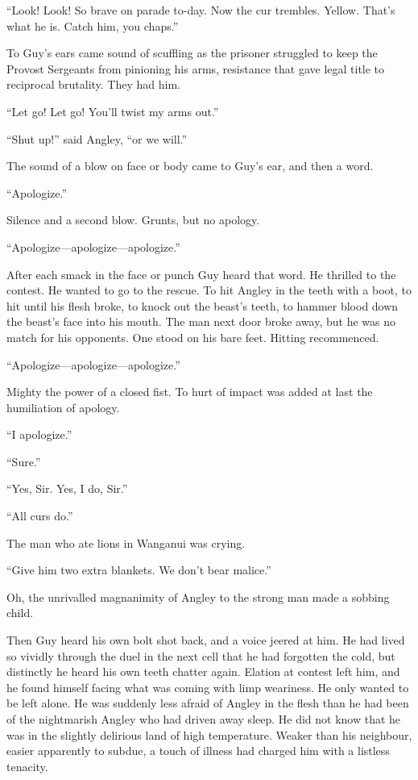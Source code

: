 ``Look! Look! So brave on parade to-day. Now the cur trembles. Yellow. 
That's what he is. Catch him, you chaps.''

To Guy's ears came sound of scuffling as the prisoner struggled to 
keep the Provost Sergeants from pinioning his arms, resistance that 
gave legal title to reciprocal brutality. They had him.

``Let go! Let go! You'll twist my arms out.''

``Shut up!'' said Angley, ``or we will.''

The sound of a blow on face or body came to Guy's ear, and then a 
word.

``Apologize.''

Silence and a second blow. Grunts, but no apology.

``Apologize---apologize---apologize.''

After each smack in the face or punch Guy heard that word. He 
thrilled to the contest. He wanted to go to the rescue. To hit 
Angley in the teeth with a boot, to hit until his flesh broke, 
to knock out the beast's teeth, to hammer blood down the beast's 
face into his mouth. The man next door broke away, but he was no 
match for his opponents. One stood on his bare feet. Hitting 
recommenced.

``Apologize---apologize---apologize.''

Mighty the power of a closed fist. To hurt of impact was added 
at last the humiliation of apology.

``I apologize.''

``Sure.''

``Yes, Sir. Yes, I do, Sir.''

``All curs do.''

The man who ate lions in Wanganui was crying.

``Give him two extra blankets. We don't bear malice.''

Oh, the unrivalled magnanimity of Angley to the strong man made 
a sobbing child.

Then Guy heard his own bolt shot back, and a voice jeered at him. 
He had lived so vividly through the duel in the next cell that he 
had forgotten the cold, but distinctly he heard his own teeth chatter 
again. Elation at contest left him, and he found himself facing 
what was coming with limp weariness. He only wanted to be left 
alone. He was suddenly less afraid of Angley in the flesh than 
he had been of the nightmarish Angley who had driven away sleep. 
He did not know that he was in the slightly delirious land of high 
temperature. Weaker than his neighbour, easier apparently to 
subdue, a touch of illness had charged him with a listless 
tenacity.


